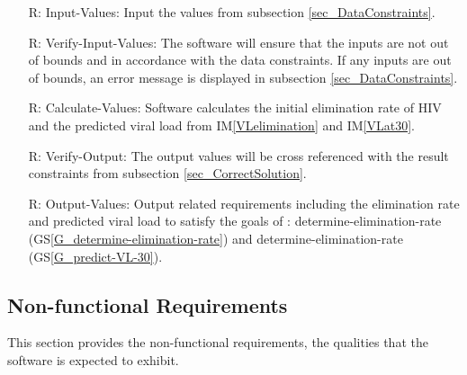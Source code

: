 \documentclass[12pt]{article}
\newcommand{\iref}[1]{IM\ref{#1}}
\newcounter{reqnum} %
\begin{document}
\noindent \begin{itemize}

\item[R\refstepcounter{reqnum}\thereqnum \label{R_Inputs}:]Input-Values: Input 
the values from subsection
 \ref{sec_DataConstraints}.

\item[R\refstepcounter{reqnum}\thereqnum \label{R_VerifyInputs}:] 
Verify-Input-Values: The software will ensure that the inputs are not out of 
bounds and in accordance with the data constraints. If any inputs are out of 
bounds, an error message is displayed in subsection \ref{sec_DataConstraints}.
    
\item[R\refstepcounter{reqnum}\thereqnum \label{R_Calculate}:] 
Calculate-Values: Software calculates the initial elimination rate of HIV and the predicted viral 
load from \iref{VLelimination} and 
\iref{VLat30}.

\item[R\refstepcounter{reqnum}\thereqnum \label{R_VerifyOutput}:]
Verify-Output: The output values will be cross referenced with the result 
constraints from subsection \ref{sec_CorrectSolution}.

\item[R\refstepcounter{reqnum}\thereqnum \label{R_Output}:] 
Output-Values: Output related requirements including the elimination rate and 
predicted viral load to satisfy the goals of \progname{}: determine-elimination-rate (GS\ref{G_determine-elimination-rate}) and determine-elimination-rate (GS\ref{G_predict-VL-30}).

\end{itemize}


\subsection{Non-functional Requirements}

This section provides the non-functional requirements, the qualities that the 
software is expected to exhibit.
\end{document}

